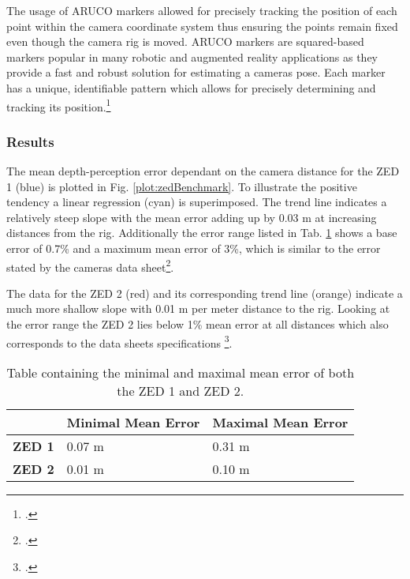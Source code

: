 The usage of ARUCO markers allowed for precisely tracking the position of each point within the camera coordinate system thus ensuring the points remain fixed even though the camera rig is moved. 
ARUCO markers are squared-based markers popular in many robotic and augmented reality applications as they provide a fast and robust solution for estimating a cameras pose. Each marker has a unique, identifiable pattern which allows for precisely determining and tracking its position.\footcite{jurado2015} 

\subsubsection{Results}

The mean depth-perception error dependant on the camera distance for the ZED 1 (blue) is plotted in Fig. \ref{plot:zedBenchmark}. To illustrate the positive tendency a linear regression (cyan) is superimposed. The trend line indicates a relatively steep slope with the mean error adding up by 0.03 m at increasing distances from the rig. Additionally the error range listed in Tab. \ref{tab:errorMinimaMaxima} shows a base error of 0.7\% and a maximum mean error of 3\%, which is similar to the error stated by the cameras data sheet\footcite{zed1Datasheet}.

The data for the ZED 2 (red) and its corresponding trend line (orange) indicate a much more shallow slope with 0.01 m per meter distance to the rig. Looking at the error range the ZED 2 lies below 1\% mean error at all distances which also corresponds to the data sheets specifications \footcite{zed2Datasheet}.



\begin{table}[h]
	\centering
	\begin{tabular}{|l|l|l|}
		\hline
		& \textbf{Minimal Mean Error} & \textbf{Maximal Mean Error} \\ \hline
		\textbf{ZED 1}  & 0.07 m 					  & 0.31 m                      \\ \hline
		\textbf{ZED 2} & 0.01 m                      & 0.10 m                      \\ \hline
	\end{tabular}
	\caption{Table containing the minimal and maximal mean error of both the ZED 1 and ZED 2.}
	\label{tab:errorMinimaMaxima}
\end{table}

